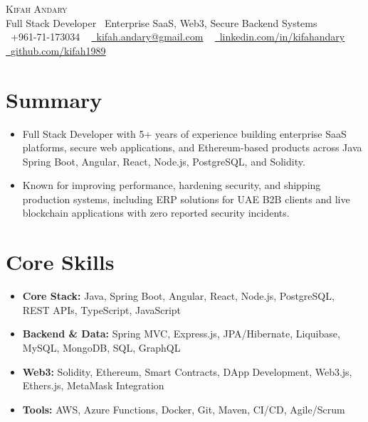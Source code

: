 \documentclass[a4paper,12pt]{article}
\newcommand{\resumeItem}[1]{
  \item\small{{#1 \vspace{-3pt}}}
}
\newcommand{\resumeSubHeadingListStart}{\begin{itemize}[leftmargin=0.15in, label={}]}
\newcommand{\resumeSubHeadingListEnd}{\end{itemize}}
\begin{document}
\begin{center}
    {\LARGE \scshape Kifah Andary} \\ \vspace{4pt}
    \small Full Stack Developer \textbar\ Enterprise SaaS, Web3, Secure Backend Systems \\ \vspace{3pt}
    \small \raisebox{-0.1\height}\faPhone\ +961-71-173034 ~ \href{mailto:kifah.andary@gmail.com}{\raisebox{-0.1\height}\faEnvelope\ \underline{kifah.andary@gmail.com}} ~
    \href{https://www.linkedin.com/in/kifahandary/}{\raisebox{-0.1\height}\faLinkedin\ \underline{linkedin.com/in/kifahandary}} ~
    \href{https://github.com/kifah1989}{\raisebox{-0.1\height}\faGithub\ \underline{github.com/kifah1989}}
\end{center}

\section{Summary}
\resumeSubHeadingListStart
  \resumeItem{Full Stack Developer with 5+ years of experience building enterprise SaaS platforms, secure web applications, and Ethereum-based products across Java Spring Boot, Angular, React, Node.js, PostgreSQL, and Solidity.}
  \resumeItem{Known for improving performance, hardening security, and shipping production systems, including ERP solutions for UAE B2B clients and live blockchain applications with zero reported security incidents.}
\resumeSubHeadingListEnd

\section{Core Skills}
\resumeSubHeadingListStart
  \resumeItem{\textbf{Core Stack:} Java, Spring Boot, Angular, React, Node.js, PostgreSQL, REST APIs, TypeScript, JavaScript}
  \resumeItem{\textbf{Backend \& Data:} Spring MVC, Express.js, JPA/Hibernate, Liquibase, MySQL, MongoDB, SQL, GraphQL}
  \resumeItem{\textbf{Web3:} Solidity, Ethereum, Smart Contracts, DApp Development, Web3.js, Ethers.js, MetaMask Integration}
  \resumeItem{\textbf{Tools:} AWS, Azure Functions, Docker, Git, Maven, CI/CD, Agile/Scrum}
\resumeSubHeadingListEnd
\end{document}
